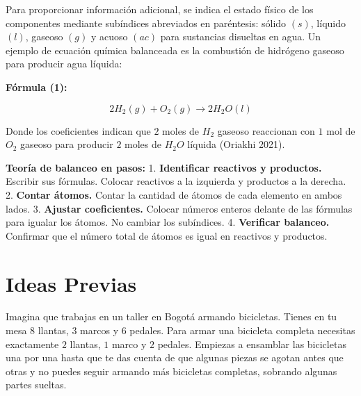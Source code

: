 \documentclass[
  spanish,
  letterpaper,
  12pt,
  oneside,
  open=any]{scrbook}
\newcommand{\setcolorsection}[2]{%
  \definecolor{currentsectionbg}{HTML}{#1}%
  \definecolor{currentsectionborder}{HTML}{#2}%
}
\begin{document}
Para proporcionar información adicional, se indica el estado físico de
los componentes mediante subíndices abreviados en paréntesis: sólido
\((s)\), líquido \((l)\), gaseoso \((g)\) y acuoso \((ac)\) para
sustancias disueltas en agua. Un ejemplo de ecuación química balanceada
es la combustión de hidrógeno gaseoso para producir agua líquida:

\textbf{Fórmula (1):}

\[2H_2(g) + O_2(g) \rightarrow 2H_2O(l)\tag{1}\]

Donde los coeficientes indican que \(2\) moles de \(H_2\) gaseoso
reaccionan con \(1\) mol de \(O_2\) gaseoso para producir \(2\) moles de
\(H_2O\) líquida (Oriakhi 2021).

\textbf{Teoría de balanceo en pasos:} 1. \textbf{Identificar reactivos y
productos.} Escribir sus fórmulas. Colocar reactivos a la izquierda y
productos a la derecha. 2. \textbf{Contar átomos.} Contar la cantidad de
átomos de cada elemento en ambos lados. 3. \textbf{Ajustar
coeficientes.} Colocar números enteros delante de las fórmulas para
igualar los átomos. No cambiar los subíndices. 4. \textbf{Verificar
balanceo.} Confirmar que el número total de átomos es igual en reactivos
y productos.

\setcolorsection{f9ebaf}{e8d68a}

\section{Ideas Previas}\label{ideas-previas-1}

Imagina que trabajas en un taller en Bogotá armando bicicletas. Tienes
en tu mesa \(8\) llantas, \(3\) marcos y \(6\) pedales. Para armar una
bicicleta completa necesitas exactamente \(2\) llantas, \(1\) marco y
\(2\) pedales. Empiezas a ensamblar las bicicletas una por una hasta que
te das cuenta de que algunas piezas se agotan antes que otras y no
puedes seguir armando más bicicletas completas, sobrando algunas partes
sueltas.
\end{document}

